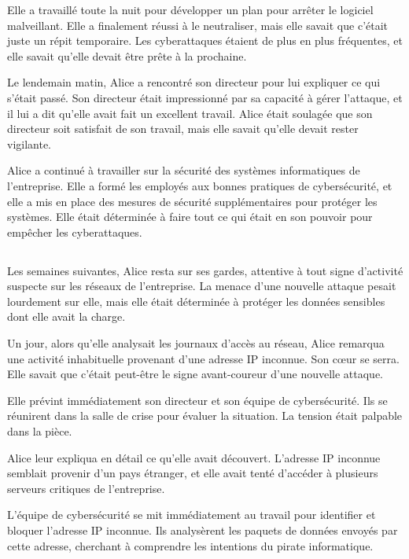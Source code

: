 \documentclass{./StyCls/MyArticle}
\begin{document}
Elle a travaillé toute la nuit pour développer un plan pour arrêter le logiciel malveillant. Elle a finalement réussi à le neutraliser, mais elle savait que c'était juste un répit temporaire. Les cyberattaques étaient de plus en plus fréquentes, et elle savait qu'elle devait être prête à la prochaine.

Le lendemain matin, Alice a rencontré son directeur pour lui expliquer ce qui s'était passé. Son directeur était impressionné par sa capacité à gérer l'attaque, et il lui a dit qu'elle avait fait un excellent travail. Alice était soulagée que son directeur soit satisfait de son travail, mais elle savait qu'elle devait rester vigilante.

Alice a continué à travailler sur la sécurité des systèmes informatiques de l'entreprise. Elle a formé les employés aux bonnes pratiques de cybersécurité, et elle a mis en place des mesures de sécurité supplémentaires pour protéger les systèmes. Elle était déterminée à faire tout ce qui était en son pouvoir pour empêcher les cyberattaques.

\subsection{}

Les semaines suivantes, Alice resta sur ses gardes, attentive à tout signe d'activité suspecte sur les réseaux de l'entreprise. La menace d'une nouvelle attaque pesait lourdement sur elle, mais elle était déterminée à protéger les données sensibles dont elle avait la charge.

Un jour, alors qu'elle analysait les journaux d'accès au réseau, Alice remarqua une activité inhabituelle provenant d'une adresse IP inconnue. Son cœur se serra. Elle savait que c'était peut-être le signe avant-coureur d'une nouvelle attaque.

Elle prévint immédiatement son directeur et son équipe de cybersécurité. Ils se réunirent dans la salle de crise pour évaluer la situation. La tension était palpable dans la pièce.

Alice leur expliqua en détail ce qu'elle avait découvert. L'adresse IP inconnue semblait provenir d'un pays étranger, et elle avait tenté d'accéder à plusieurs serveurs critiques de l'entreprise.

L'équipe de cybersécurité se mit immédiatement au travail pour identifier et bloquer l'adresse IP inconnue. Ils analysèrent les paquets de données envoyés par cette adresse, cherchant à comprendre les intentions du pirate informatique.
\end{document}
